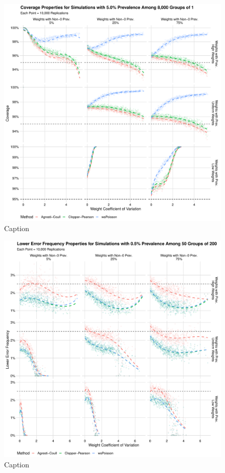 \documentclass[AMA,STIX1COL]{WileyNJD-v2}
\begin{document}
\begin{figure}
\centering
\includegraphics[width=\textwidth]{figures/perfect_coverage_8000_groups_0_05_prev.pdf}
\caption{Caption}
\label{fig:perfect_coverage_8000_groups_0_05_prev}
\end{figure}

\begin{figure}
\centering
\includegraphics[width=\textwidth]{figures/perfect_lower_error_frequency_50_groups_0_005_prev.pdf}
\caption{Caption}
\label{fig:perfect_lower_error_frequency_50_groups_0_005_prev}
\end{figure}
\end{document}
